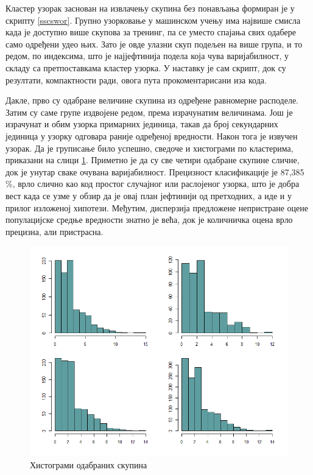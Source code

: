 \documentclass[a4paper]{article}
\begin{document}
Кластер узорак заснован на извлачењу скупина без понављања формиран је у скрипту \ref{sscswor}. Групно узорковање у машинском учењу има највише смисла када је доступно више скупова за тренинг, па се уместо спајања свих одабере само одређени удео њих. Зато је овде улазни скуп подељен на више група, и то редом, по индексима, што је најјефтинија подела која чува варијабилност, у складу са претпоставкама кластер узорка. У наставку је сам скрипт, док су резултати, компактности ради, овога пута прокоментарисани иза кода.



Дакле, прво су одабране величине скупина из одређене равномерне расподеле. Затим су саме групе издвојене редом, према израчунатим величинама. Још је израчунат и обим узорка примарних јединица, такав да број секундарних јединица у узорку одговара раније одређеној вредности. Након тога је извучен узорак. Да је груписање било успешно, сведоче и хистограми по кластерима, приказани на слици \ref{skupp}. Приметно је да су све четири одабране скупине сличне, док је унутар сваке очувана варијабилност. Прецизност класификације је 87,385 \%, врло слично као код простог случајног или раслојеног узорка, што је добра вест када се узме у обзир да је овај план јефтинији од претходних, а иде и у прилог изложеној хипотези. Међутим, дисперзија предложене непристране оцене популацијске средње вредности знатно је већа, док је количничка оцена врло прецизна, али пристрасна.

\begin{figure}[h!]
\begin{center}
\includegraphics[scale=0.7]{../Slike za rad/Skupine.png}
\end{center}
\caption{Хистограми одабраних скупина}
\label{skupp}
\end{figure}
\end{document}
